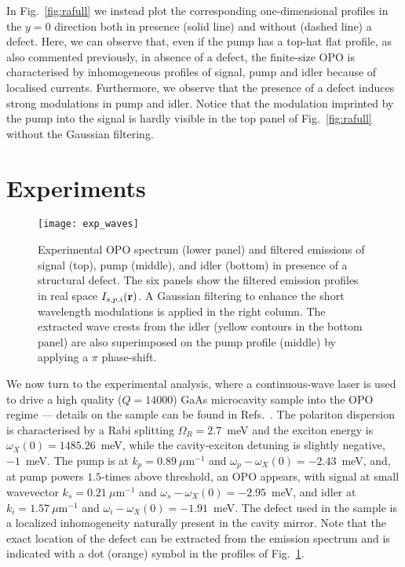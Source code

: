 %
In Fig.~\ref{fig:rafull} we instead plot the corresponding
one-dimensional profiles in the $y=0$ direction both in presence
(solid line) and without (dashed line) a defect. Here, we can observe
that, even if the pump has a top-hat flat profile, as also commented
previously, in absence of a defect, the finite-size OPO is
characterised by inhomogeneous profiles of signal, pump and idler
because of localised currents. Furthermore, we observe that the
presence of a defect induces strong modulations in pump and idler.
%
Notice that the modulation imprinted by the pump into the signal is
hardly visible in the top panel of Fig.~\ref{fig:rafull} without the
Gaussian filtering.


\section{Experiments}
\label{sec:daniele-experiments}

%
\begin{figure}[tb]\centering
  \texttt{[image: exp\_waves]}
  \caption{Experimental OPO spectrum (lower panel) and filtered
    emissions of signal (top), pump (middle), and idler (bottom) in
    presence of a structural defect. The six panels show the filtered
    emission profiles in real space $I_{s, p,i}(\mathbf{r})$. A Gaussian
    filtering to enhance the short wavelength modulations is applied
    in the right column. The extracted wave crests from the idler
    (yellow contours in the bottom panel) are also superimposed on the
    pump profile (middle) by applying a $\pi$ phase-shift.}
\label{fig:exper}
\end{figure}
%
We now turn to the experimental analysis, where a continuous-wave
laser is used to drive a high quality ($Q=14000$) GaAs microcavity
sample into the OPO regime --- details on the sample can be found in
Refs.~\cite{Ballarini_2013,Dominici_2014}.
The polariton dispersion is characterised by a Rabi splitting
$\Omega_R=2.7$~meV and the exciton energy is
$\omega_X(0)=1485.26$~meV, while the cavity-exciton detuning is
slightly negative, $-1$~meV. The pump is at $k_p=0.89~\mu$m$^{-1}$ and
$\omega_p - \omega_{X}(0)=-2.43$~meV, and, at pump powers $1.5$-times
above threshold, an OPO appears, with signal at small wavevector
$k_s=0.21~\mu$m$^{-1}$ and $\omega_s - \omega_{X}(0)=-2.95$~meV, and
idler at $k_i=1.57~\mu$m$^{-1}$ and
$\omega_i - \omega_{X}(0)=-1.91$~meV.
%
The defect used in the sample is a localized inhomogeneity naturally
present in the cavity mirror. Note that the exact location of the
defect can be extracted from the emission spectrum and is indicated
with a dot (orange) symbol in the profiles of Fig.~\ref{fig:exper}.

